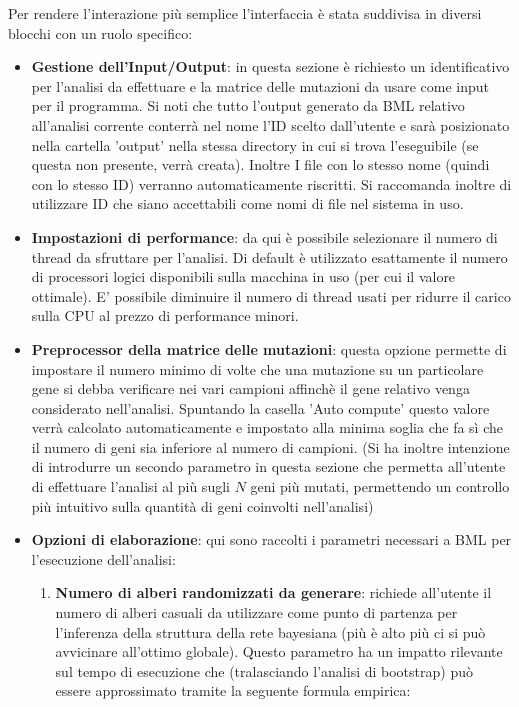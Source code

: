 \documentclass[a4paper]{article}
\begin{document}
	Per rendere l'interazione più semplice l'interfaccia è stata 
	suddivisa in diversi blocchi con un ruolo specifico:
	\begin{itemize}
	\item \textbf{Gestione dell'Input/Output}: in questa sezione è richiesto
	un identificativo per l'analisi da effettuare e la matrice delle mutazioni
	da usare come input per il programma. Si noti che tutto l'output generato
	da BML relativo all'analisi corrente conterrà nel nome l'ID scelto dall'utente 
	e sarà posizionato nella cartella 'output' nella stessa directory in cui 
	si trova l'eseguibile (se questa non presente, verrà creata). Inoltre
	I file con lo stesso nome (quindi con lo stesso ID) verranno automaticamente
	riscritti. Si raccomanda inoltre di utilizzare ID che siano accettabili
	come nomi di file nel sistema in uso. 
	\item \textbf{Impostazioni di performance}: da qui è possibile
	selezionare il numero di thread da sfruttare per l'analisi. Di default è 
	utilizzato esattamente il numero di processori logici
	disponibili sulla macchina in uso (per cui il valore ottimale).
	E' possibile diminuire il numero di thread usati per ridurre 
	il carico sulla	CPU al prezzo di performance minori. 
	\item \textbf{Preprocessor della matrice delle mutazioni}: questa opzione
	permette di impostare il numero minimo di volte che una mutazione su un
	particolare gene si debba  
	verificare nei vari campioni affinchè il gene relativo venga considerato
	nell'analisi.
	Spuntando la casella 'Auto compute' questo valore verrà calcolato 
	automaticamente e impostato alla minima soglia che 
	fa sì che il numero di geni sia inferiore al numero di campioni.  
	(Si ha inoltre intenzione di introdurre un secondo parametro in questa sezione 
	che permetta all'utente di effettuare l'analisi al più sugli $N$ geni più mutati, permettendo 
	un controllo più intuitivo sulla quantità di geni coinvolti nell'analisi) 
	\item \textbf{Opzioni di elaborazione}: qui sono raccolti i parametri necessari a BML per
	l'esecuzione dell'analisi:
	\begin{enumerate}
	\item \textbf{Numero di alberi randomizzati da generare}: richiede all'utente il numero 
	di alberi casuali da utilizzare come punto di partenza per l'inferenza della struttura della rete bayesiana
	(più è alto più ci si può avvicinare all'ottimo globale). Questo parametro ha un impatto rilevante sul tempo
	di esecuzione che (tralasciando l'analisi di bootstrap) può essere approssimato tramite la seguente formula
	empirica: 


\end{enumerate}
\end{itemize}
\end{document}
